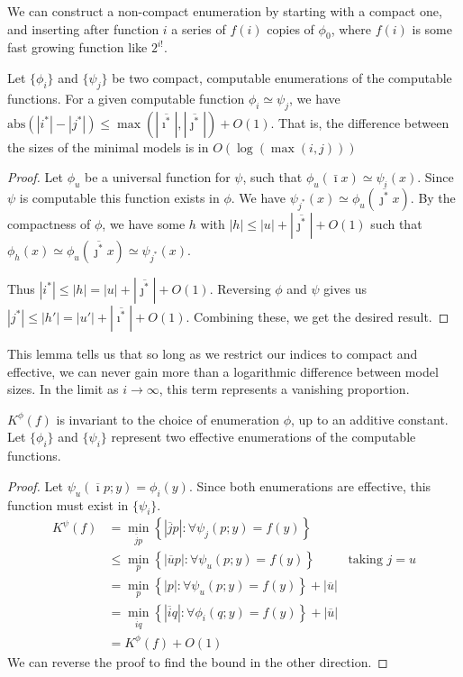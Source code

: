 \documentclass{style/llncs}
\newcommand{\s}[1]{{\overline{#1}}}
\begin{document}
We can construct a non-compact enumeration by starting with a compact one, and inserting after function $i$ a series of $f(i)$ copies of $\phi_0$, where $f(i)$ is some fast growing function like $2^{i!}$.

\begin{lemma}
Let $\{\phi_i\}$ and $\{\psi_j\}$ be two compact, computable enumerations of the computable functions. For a given computable function $\phi_i \simeq \psi_j$,  we have $\mbox{abs}(|i^*| - |j^*|) \leq \max(|\overline{\imath^*}|, |\overline{\jmath^*}|) + O(1)$. That is, the difference between the sizes of the minimal models is in $O(\log(\max(i, j)))$
\end{lemma}
\begin{proof}
Let $\phi_u$ be a universal function for $\psi$, such that $\phi_u(\bar{\imath}x) \simeq \psi_i(x)$. Since $\psi$ is computable this function exists in $\phi$. We have $\psi_{j^*}(x) \simeq \phi_u(\overline{\jmath^*}x)$. By the compactness of $\phi$, we have some $h$ with $|h| \leq |u| + |\overline{\jmath^*}| + O(1)$ such that $\phi_{h}(x) \simeq \phi_u(\overline{\jmath^*}x) \simeq \psi_{j^*}(x)$. 

Thus $|i^*| \leq |h| = |u| + |\overline{\jmath^*}| + O(1)$. Reversing $\phi$ and $\psi$ gives us $|j^*| \leq |h'| = |u'| + |\overline{\imath^*}| + O(1)$. Combining these, we get the desired result.
\end{proof}

This lemma tells us that so long as we restrict our indices to compact and effective, we can never gain more than a logarithmic difference between model sizes. In the limit as $i \rightarrow \infty$, this term represents a vanishing proportion.

\begin{theorem}
$K^\phi(f)$ is invariant to the choice of enumeration $\phi$, up to an additive constant. Let $\{\phi_i\}$ and $\{\psi_i\}$ represent two effective enumerations of the computable functions.
\end{theorem} 
\begin{proof}
Let $\psi_u(\s{\imath}p; y) = \phi_i(y)$. Since both enumerations are effective, this function must exist in $\{\psi_i\}$.
\begin{align*}
K^\psi(f) &= \min_{\s{j}p}\left\{|\s{j}p| : \forall \psi_j(p ; y) = f(y)\right\} \\
&\leq  \min_{p}\left\{|\s{u}p| : \forall \psi_u(p ; y) = f(y)\right\} & \text{taking $j = u$}\\
&= \min_{p}\left\{|p| : \forall \psi_u(p ; y) = f(y)\right\} + |\s{u}| \\
&= \min_{\s{i}q}\left\{|\s{i}q| : \forall \phi_i(q ; y) = f(y)\right\} + |\s{u}| \\
&= K^\phi(f) + O(1)
\end{align*}
We can reverse the proof to find the bound in the other direction.
\end{proof}
\end{document}
